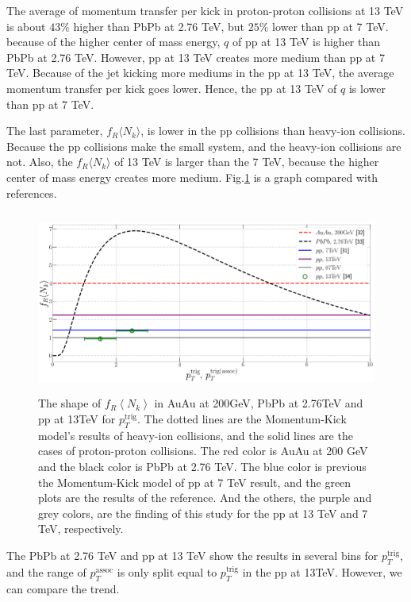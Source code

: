 \documentclass[jkps,fleqn,showpacs,showkeys]{revtex4}
\begin{document}
The average of momentum transfer per kick in proton-proton collisions at 13 TeV is about $43\%$ higher than PbPb at 2.76 TeV, but $25\%$ lower than pp at 7 TeV.
because of the higher center of mass energy, $q$ of pp at 13 TeV is higher than PbPb at 2.76 TeV.
However, pp at 13 TeV creates more medium than pp at 7 TeV.
Because of the jet kicking more mediums in the pp at 13 TeV, the average momentum transfer per kick goes lower.
Hence, the pp at 13 TeV of $q$ is lower than pp at 7 TeV.

The last parameter, $f_R \langle N_k \rangle$, is lower in the pp collisions than heavy-ion collisions.
Because the pp collisions make the small system, and the heavy-ion collisions are not.
Also, the $f_R \langle N_k \rangle$ of 13 TeV is larger than the 7 TeV, because the higher center of mass energy creates more medium.
Fig.\ref{figure:frnk} is a graph compared with references\cite{Wong_1, PbPb, Hanul}.


\begin{figure}[ht]
  \centering
  \includegraphics[width=12cm, height=6cm]{./Figures/Paper_frnk}
  \caption{The shape of $f_R \left\langle N_k \right\rangle$ in AuAu at 200GeV, PbPb at 2.76TeV and pp at 13TeV for $p_{T}^{\text{trig}}$.
  The dotted lines are the Momentum-Kick model's results of heavy-ion collisions, and the solid lines are the cases of proton-proton collisions.
  The red color is AuAu at 200 GeV\cite{Wong_1} and the black color is PbPb at 2.76 TeV\cite{PbPb}.
  The blue color is previous the Momentum-Kick model of pp at 7 TeV result\cite{Wong_5}, and the green plots are the results of the reference\cite{Hanul}.
  And the others, the purple and grey colors, are the finding of this study for the pp at 13 TeV and 7 TeV, respectively.
  }
  \label{figure:frnk}
\end{figure}

The PbPb at 2.76 TeV and pp at 13 TeV show the results in several bins for $p_T^{\text{trig}}$, and the range of $p_T^{\text{assoc}}$ is only split equal to $p_T^{\text{trig}}$ in the pp at 13TeV.
However, we can compare the trend.
\end{document}
